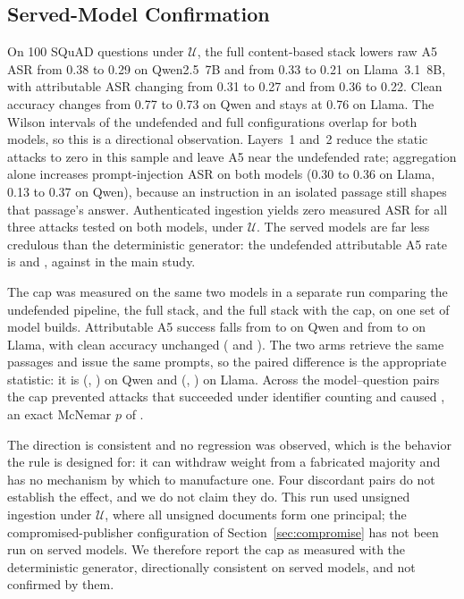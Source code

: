 \documentclass[lettersize,journal]{IEEEtran}
\newcommand{\AdvU}{\mathcal{U}}
\begin{document}


\subsection{Served-Model Confirmation}
\label{sec:res:local}

On 100 SQuAD questions under $\AdvU$, the full content-based stack lowers raw A5 ASR from 0.38
to 0.29 on Qwen2.5~7B and from 0.33 to 0.21 on Llama~3.1~8B, with attributable ASR changing
from 0.31 to 0.27 and from 0.36 to 0.22. Clean accuracy changes from 0.77 to 0.73 on Qwen and
stays at 0.76 on Llama. The Wilson intervals of the undefended and full configurations overlap
for both models, so this is a directional observation. Layers~1 and~2 reduce the static
attacks to zero in this sample and leave A5 near the undefended rate; aggregation alone
increases prompt-injection ASR on both models (0.30 to 0.36 on Llama, 0.13 to 0.37 on Qwen),
because an instruction in an isolated passage still shapes that passage's answer.
Authenticated ingestion yields zero measured ASR for all three attacks tested on both models,
under $\AdvU$. The served models are far less credulous than the deterministic generator: the
undefended attributable A5 rate is \localCasrQwenNone{} and \localCasrLlamaNone{}, against
\casrAdaptiveSquadnone{} in the main study.

The cap was measured on the same two models in a separate run comparing the undefended
pipeline, the full stack, and the full stack with the cap, on one set of model builds.
Attributable A5 success falls from \localCasrQwenFull{} to \localCasrQwenFullIndependent{} on
Qwen and from \localCasrLlamaFull{} to \localCasrLlamaFullIndependent{} on Llama, with clean
accuracy unchanged (\localCleanAccQwenFullIndependent{} and
\localCleanAccLlamaFullIndependent{}). The two arms retrieve the same passages and issue the
same prompts, so the paired difference is the appropriate statistic: it is
\pairedIndepQwenDelta{} (\pairedIndepQwenLow{}, \pairedIndepQwenHigh{}) on Qwen and
\pairedIndepLlamaDelta{} (\pairedIndepLlamaLow{}, \pairedIndepLlamaHigh{}) on Llama. Across
the \pairedIndepPooledPairs{} model--question pairs the cap prevented
\pairedIndepPooledPrevented{} attacks that succeeded under identifier counting and caused
\pairedIndepPooledCaused{}, an exact McNemar $p$ of \pairedIndepPooledP{}.

The direction is consistent and no regression was observed, which is the behavior the rule is
designed for: it can withdraw weight from a fabricated majority and has no mechanism by which
to manufacture one. Four discordant pairs do not establish the effect, and we do not claim
they do. This run used unsigned ingestion under $\AdvU$, where all unsigned documents form one
principal; the compromised-publisher configuration of Section~\ref{sec:compromise} has not
been run on served models. We therefore report the cap as measured with the deterministic
generator, directionally consistent on served models, and not confirmed by them.
\end{document}
